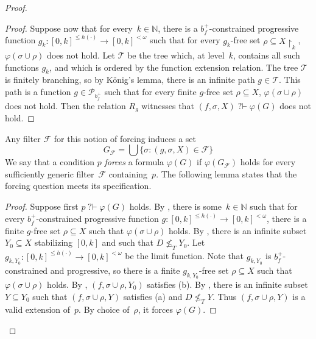 \documentclass{article}
\def\F{\mathcal{F}}
\def\P{\mathcal{P}}
\newcommand{\uh}{\upharpoonright}
\newcommand{\qvdash}{\operatorname{{?}{\vdash}}}
\newcommand{\nqvdash}{\operatorname{{?}{\nvdash}}}
\newcommand{\NN}[0]{\mathbb{N}}
\numberwithin{theorem}{section}
\newtheorem{lemma}[theorem]{Lemma}
\newcommand{\T}{\mathcal{T}}
\begin{document}
\begin{proof}
\begin{proof}
Suppose now that for every~$k \in \NN$, there is a $b_f^{+}$-constrained progressive function $g_k : [0, k]^{\leq h(\cdot)} \to [0, k]^{<\omega}$ such that for every $g_k$-free set $\rho \subseteq X \uh_k$, $\varphi(\sigma \cup \rho)$ does not hold. Let $\T$ be the tree which, at level~$k$, contains all such functions $g_k$, and which is ordered by the function extension relation. The tree $\T$ is finitely branching, so by K\"onig's lemma, there is an infinite path $g \in \T$. This path is a function $g \in \P_{b_f^+}$ such that for every finite $g$-free set $\rho \subseteq X$, $\varphi(\sigma \cup \rho)$ does not hold. Then the relation $R_g$ witnesses that $(f, \sigma, X) \qvdash \varphi(G)$ does not hold.
\end{proof}

Any filter $\F$ for this notion of forcing induces a set 
$$
G_\F = \bigcup \{ \sigma : (g, \sigma, X) \in \F \}
$$
We say that a condition $p$ \emph{forces} a formula $\varphi(G)$ if $\varphi(G_\F)$ holds for every sufficiently generic filter~$\F$ containing~$p$.
The following lemma states that the forcing question meets its specification.

\begin{proof}
Suppose first $p \qvdash \varphi(G)$ holds. By , there is some~$k \in \NN$ such that for every $b_f^{+}$-constrained progressive function $g : [0, k]^{\leq h(\cdot)} \to [0, k]^{<\omega}$, there is a finite $g$-free set $\rho \subseteq X$ such that $\varphi(\sigma \cup \rho)$ holds. By , there is an infinite subset $Y_0 \subseteq X$ stabilizing $[0, k]$ and such that $D \not \leq_T Y_0$. Let $g_{k,Y_0} : [0, k]^{\leq h(\cdot)} \to [0, k]^{<\omega}$ be the limit function. Note that $g_{k,Y_0}$ is $b_f^{+}$-constrained and progressive, so there is a finite $g_{k,Y_0}$-free set $\rho \subseteq X$ such that $\varphi(\sigma \cup \rho)$ holds.
By , $(f, \sigma \cup \rho, Y_0)$ satisfies (b).
By , there is an infinite subset $Y \subseteq Y_0$ such that $(f, \sigma \cup \rho, Y)$ satisfies (a) and $D \not \leq_T Y$. Thus $(f, \sigma \cup \rho, Y)$ is a valid extension of~$p$. By choice of~$\rho$, it forces $\varphi(G)$.


\end{proof}
\end{proof}
\end{document}

